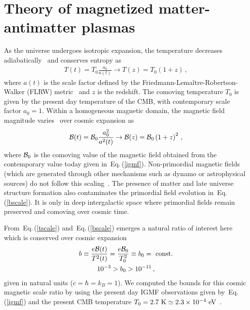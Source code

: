 \documentclass[aps,prd,floatfix,reprint]{revtex4-2}
\newcommand*{\eV}{\text{ eV}}
\newcommand{\req}[1]{Eq.\,(\ref{#1})}
\begin{document}
\section{Theory of magnetized matter-antimatter plasmas}
\label{sec:thermal}
\noindent As the universe undergoes isotropic expansion, the temperature decreases adiabatically~\cite{Abdalla:2022yfr} and conserves entropy as 
\begin{align}
 \label{tscale}
 T(t)=T_{0}\frac{a_{0}}{a(t)}\rightarrow T(z)=T_{0}(1+z)\,,
\end{align}
where $a(t)$ is the scale factor defined by the Friedmann-Lema{\^i}tre-Robertson-Walker (FLRW) metric~\cite{weinberg1972gravitation} and $z$ is the redshift. The comoving temperature $T_{0}$ is given by the present day temperature of the CMB, with contemporary scale factor $a_{0}=1$. Within a homogeneous magnetic domain, the magnetic field magnitude varies~\cite{Durrer:2013pga} over cosmic expansion as
\begin{align}
 \label{bscale}
 {\cal B}(t)={\cal B}_{0}\frac{a_{0}^{2}}{a^{2}(t)}\rightarrow{\cal B}(z)={\cal B}_{0}\left(1+z\right)^{2}\,,
\end{align}
where ${\cal B}_{0}$ is the comoving value of the magnetic field obtained from the contemporary value today given in~\req{igmf}. Non-primordial magnetic fields (which are generated through other mechanisms such as dynamo or astrophysical sources) do not follow this scaling~\cite{Pomakov:2022cem}. The presence of matter and late universe structure formation also contaminates the primordial field evolution in~\req{bscale}. It is only in deep intergalactic space where primordial fields remain preserved and comoving over cosmic time.

From~\req{tscale} and~\req{bscale} emerges a natural ratio of interest here which is conserved over cosmic expansion 
\begin{gather}
 \label{tbscale}
 b \equiv\frac{e{\cal B}(t)}{T^{2}(t)}=\frac{e{\cal B}_{0}}{T_{0}^{2}}\equiv b_0={\rm\ const.}\\
 10^{-3}>b_{0}>10^{-11}\,,
\end{gather}
given in natural units ($c=\hbar=k_{B}=1$). We computed the bounds for this cosmic magnetic scale ratio by using the present day IGMF observations given by~\req{igmf} and the present CMB temperature $T_{0}=2.7{\rm\ K}\simeq2.3\times10^{-4}\eV$~\cite{Planck:2018vyg}.
\end{document}
